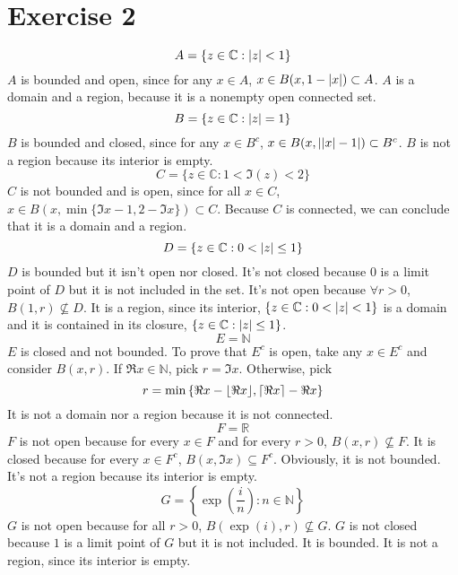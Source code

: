\documentclass{report}
\def\C{\mathbb{C}}
\def\R{\mathbb{R}}
\def\N{\mathbb{N}}
\DeclarePairedDelimiter\abs{\lvert}{\rvert}%
\DeclarePairedDelimiter\ceil{\lceil}{\rceil}
\DeclarePairedDelimiter\floor{\lfloor}{\rfloor}
\renewcommand{\exp}[1]{\operatorname{exp}\left(#1\right)}
\begin{document}
    \section*{Exercise 2}
    \begin{equation*}
        A = \{z \in \C : \abs{z} < 1\}
    \end{equation*}
    $A$ is bounded and open, since for any $x \in A$, $x \in B(x, 1 - \abs{x}) \subset A$. $A$ is a domain and a region, because it is a nonempty open connected set.
    \begin{equation*}
        B = \{z \in \C : \abs{z} = 1\}
    \end{equation*}
    $B$ is bounded and closed, since for any $x \in B^c$, $x \in B(x, \abs{\abs{x} - 1}) \subset B^c$. $B$ is not a region because its interior is empty.
    \begin{equation*}
        C = \{z \in \C : 1 < \Im(z) < 2\}
    \end{equation*}
    $C$ is not bounded and is open, since for all $x \in C$, $x \in B(x, \min{\{\Im{x} - 1, 2 - \Im{x}}\}) \subset C$. Because $C$ is connected, we can conclude that it is a domain and a region.
    \begin{equation*}
        D = \{z \in \C : 0 < \abs{z} \leq 1\}
    \end{equation*}
    $D$ is bounded but it isn't open nor closed. It's not closed because $0$ is a limit point of $D$ but it is not included in the set. It's not open because $\forall r > 0$, $B(1, r) \nsubseteq D$. It is a region, since its interior, $\{z \in \C : 0 < \abs{z} < 1\}$ is a domain and it is contained in its closure, $\{z \in \C : \abs{z} \leq 1\}$.
    \begin{equation*}
        E = \N
    \end{equation*}
    $E$ is closed and not bounded. To prove that $E^c$ is open, take any $x \in E^c$ and consider $B(x, r)$. If $\Re{x} \in \N$, pick $r = \Im{x}$. Otherwise, pick 
    \begin{equation*}
        r = \min{\{\Re{x} - \floor{\Re{x}}, \ceil{\Re{x}} - \Re{x}\}}
    \end{equation*}
    It is not a domain nor a region because it is not connected.
    \begin{equation*}
        F = \R
    \end{equation*}
    $F$ is not open because for every $x \in F$ and for every $r > 0$, $B(x, r) \nsubseteq F$. It is closed because for every $x \in F^c$, $B(x, \Im{x}) \subseteq F^c$. Obviously, it is not bounded. It's not a region because its interior is empty.
    \begin{equation*}
        G = \left\{\exp{\frac{i}{n}} : n \in \N\right\}
    \end{equation*}
    $G$ is not open because for all $r > 0$, $B(\exp{i}, r) \nsubseteq G$. $G$ is not closed because $1$ is a limit point of $G$ but it is not included. It is bounded. It is not a region, since its interior is empty.
\end{document}
